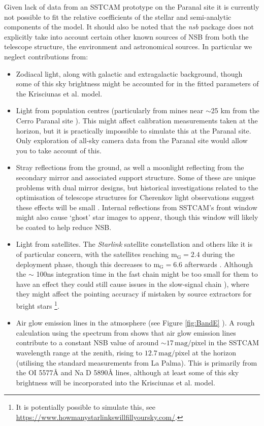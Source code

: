 Given lack of data from an SSTCAM prototype on the Paranal site it is currently not possible to fit the relative coefficients of the stellar and semi-analytic components of the model.  It should also be noted that the \textit{nsb} package does not explicitly take into account certain other known sources of NSB from both the telescope structure, the environment and astronomical sources. In particular we neglect contributions from:
\begin{itemize}
    \item Zodiacal light, along with galactic and extragalactic background, though some of this sky brightness might be accounted for in the fitted parameters of the Krisciunas et al. model.
    \item Light from population centres (particularly from mines near $\sim$25 km from the Cerro Paranal site \cite{cpmines}). This might affect calibration measurements taken at the horizon, but it is practically impossible to simulate this at the Paranal site. Only exploration of all-sky camera data from the Paranal site would allow you to take account of this.
    \item Stray reflections from the ground, as well a moonlight reflecting from the secondary mirror and associated support structure. Some of these are unique problems with dual mirror designs, but historical investigations related to the optimisation of telescope structures for Cherenkov light observations suggest these effects will be small \cite{pinktelescope}. Internal reflections from SSTCAM's front window might also cause `ghost' star images to appear, though this window will likely be coated to help reduce NSB.
    \item Light from satellites. The \textit{Starlink} satellite constellation and others like it is of particular concern, with the satellites reaching $\mathrm{m_G=2.4}$ during the deployment phase, though this decreases to $\mathrm{m_G=6.6}$ afterwards \cite{starlink}. Although the $\sim$ 100ns integration time in the fast chain might be too small for them to have an effect they could still cause issues in the slow-signal chain \cite{starlinkcta}), where they might affect the pointing accuracy if mistaken by source extractors for bright stars \footnote{It is potentially possible to simulate this, see \url{https://www.howmanystarlinkswillfillyoursky.com/}.}.
    \item Air glow emission lines in the atmosphere (see Figure \ref{fig:BandE} \cite{BandE}). A rough calculation using the spectrum from \cite{BandE} shows that air glow emission lines contribute to a constant NSB value of around $\mathrm{\sim17\,mag/pixel}$ in the SSTCAM wavelength range at the zenith, rising to $\mathrm{12.7\,mag/pixel}$ at the horizon (utilising the standard \cite{BandE} measurements from La Palma). This is primarily from the OI 5577\r{A} and Na D 5890\r{A} lines, although at least some of this sky brightness will be incorporated into the Krisciunas et al. model.

\end{itemize}
